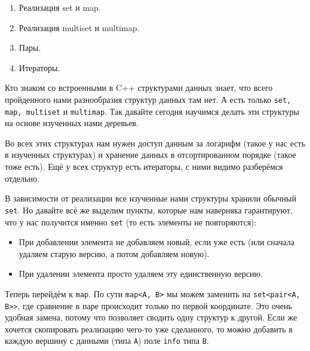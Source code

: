\label{md2tex12}
\hyperref[md2texREADME]{\color{cyan}{К главному описанию}}


\begin{enumerate}
    \item Реализация set и map.
    \item Реализация multiset и multimap.
    \item Пары.
    \item Итераторы.
\end{enumerate}


Кто знаком со встроенными в C++ структурами данных знает, что всего пройденного нами разнообразия структур данных там нет. А есть только \texttt{set, map, multiset} и \texttt{multimap}. Так давайте сегодня научимся делать эти структуры на основе изученных нами деревьев.

Во всех этих структурах нам нужен доступ данным за логарифм (такое у нас есть в изученных структурах) и хранение данных в отсортированном порядке (такое тоже есть). Ещё у всех структур есть итераторы, с ними видимо разберёмся отдельно.


В зависимости от реализации все изученные нами структуры хранили обычный \texttt{set}. Но давайте всё же выделим пункты, которые нам наверняка гарантируют, что у нас получится именно \texttt{set} (то есть элементы не повторяются):
\begin{itemize}
    \item При добавлении элемента не добавляем новый, если уже есть (или сначала удаляем старую версию, а потом добавляем новую).
    \item При удалении элемента просто удаляем эту единственную версию.
\end{itemize}

Теперь перейдём к \texttt{map}. По сути \texttt{map<A, B>} мы можем заменить на \texttt{set<pair<A, B>>}, где сравнение в паре происходит только по первой координате. Это очень удобная замена, потому что позволяет сводить одну структур к другой. Если же хочется скопировать реализацию чего-то уже сделанного, то можно добавить в каждую вершину с данными (типа \texttt{A}) поле \texttt{info} типа \texttt{B}.



